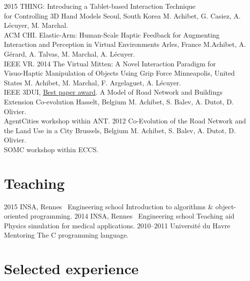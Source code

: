 \documentclass[]{friggeri-cv}
\begin{document}
\begin{entrylist}
  \entry
    {2015}
    {THING: Introducing a Tablet-based Interaction Technique\\ for Controlling 3D Hand Models}
    {Seoul, South Korea}
    {M. Achibet, G. Casiez, A. Lécuyer, M. Marchal.\\ ACM CHI.}
  \entry
    {}
    {Elastic-Arm: Human-Scale Haptic Feedback for Augmenting\\ Interaction and Perception in Virtual Environments}
    {Arles, France}
    {M.Achibet, A. Gérard, A. Talvas, M. Marchal, A. Lécuyer.\\ IEEE VR.}
  \entry
    {2014}
    {The Virtual Mitten: A Novel Interaction Paradigm for\\ Visuo-Haptic Manipulation of Objects Using Grip Force}
    {Minneapolis, United States}
    {M. Achibet, M. Marchal, F. Argelaguet, A. Lécuyer.\\ IEEE 3DUI, \underline{Best paper award}.}
  \entry
    {}
    {A Model of Road Network and Buildings Extension Co-evolution}
    {Hasselt, Belgium}
    {M. Achibet, S. Balev, A. Dutot, D. Olivier.\\ AgentCities workshop within ANT.}
  \entry
    {2012}
    {Co-Evolution of the Road Network and the Land Use in a City}
    {Brussels, Belgium}
    {M. Achibet, S. Balev, A. Dutot, D. Olivier.\\ SOMC workshop within ECCS.}

\end{entrylist}

\newpage

\section{Teaching}

\begin{entrylist}
  \entry
    {2015}
    {INSA, Rennes \textemdash\ Engineering school}
    {}
    {Introduction to algorithms \& object-oriented programming.}
  \entry
    {2014}
    {INSA, Rennes \textemdash\ Engineering school}
    {Teaching aid}
    {Physics simulation for medical applications.}
  \entry
    {2010–2011}
    {Université du Havre}
    {Mentoring}
    {The C programming language.}
\end{entrylist}

\section{Selected experience}
\end{document}
